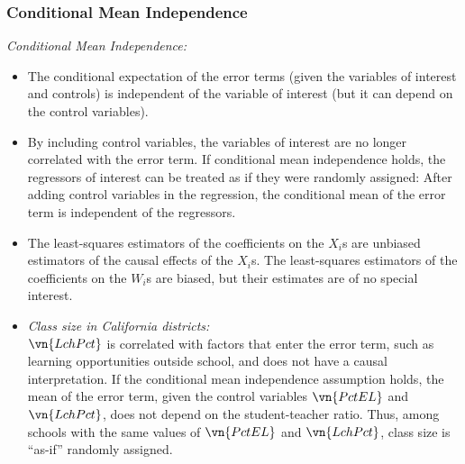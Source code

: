 \begin{frame}
\frametitle{Conditional Mean Independence}
\emph{Conditional Mean Independence:}
\begin{itemize}
\item The conditional expectation of the error terms (given the variables of interest and controls) is independent of the variable of interest (but it can depend on the control variables).
\item By including control variables, the variables of interest are no longer correlated with the error term. If conditional mean independence holds, the regressors of interest can be treated as if they were randomly assigned: After adding control variables in the regression, the conditional mean of the error term is independent of the regressors. 
\item The least-squares estimators of the coefficients on the $X_{i}$s are unbiased estimators of the causal effects of the $X_{i}$s. The least-squares estimators of the coefficients on the $W_{i}$s are biased, but their estimates are of no special interest. 
\item \emph{Class size in California districts:}\\ 
$\vn{LchPct}$ is correlated with factors that enter the error term, such as learning opportunities outside school, and does not have a causal interpretation. If the conditional mean independence assumption holds, the mean of the error term, given the control variables $\vn{PctEL}$ and $\vn{LchPct}$, does not depend on the student-teacher ratio. Thus, among schools with the same values of $\vn{PctEL}$ and $\vn{LchPct}$, class size is ``as-if'' randomly assigned.
\end{itemize}
\end{frame}

